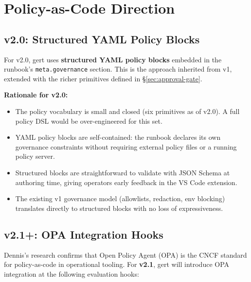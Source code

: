 \section{Policy-as-Code Direction}

\subsection{v2.0: Structured YAML Policy Blocks}

For v2.0, gert uses \textbf{structured YAML policy blocks} embedded in the runbook's
\texttt{meta.governance} section. This is the approach inherited from v1, extended with the
richer primitives defined in §\ref{sec:approval-gate}.

\textbf{Rationale for v2.0:}
\begin{itemize}
  \item The policy vocabulary is small and closed (six primitives as of v2.0). A full policy
        DSL would be over-engineered for this set.
  \item YAML policy blocks are self-contained: the runbook declares its own governance
        constraints without requiring external policy files or a running policy server.
  \item Structured blocks are straightforward to validate with JSON Schema at authoring time,
        giving operators early feedback in the VS Code extension.
  \item The existing v1 governance model (allowlists, redaction, env blocking) translates
        directly to structured blocks with no loss of expressiveness.
\end{itemize}

\subsection{v2.1+: OPA Integration Hooks}

Dennis's research confirms that Open Policy Agent (OPA) is the CNCF standard for
policy-as-code in operational tooling. For \textbf{v2.1}, gert will introduce OPA
integration at the following evaluation hooks:

